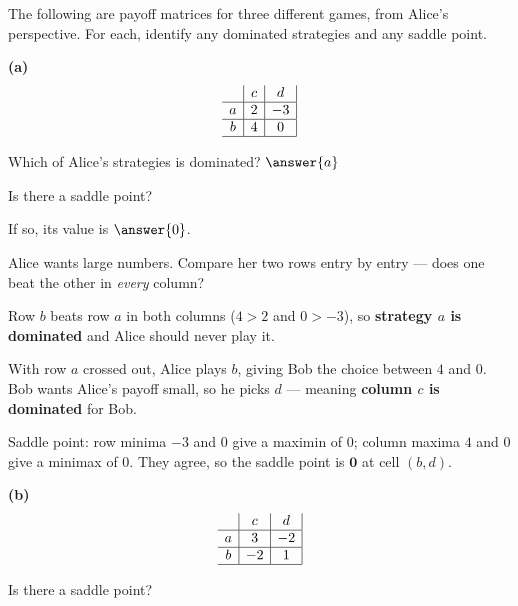 \documentclass[12pt]{ximera}
\begin{document}
\begin{problem}
The following are payoff matrices for three different games, from Alice's perspective.
For each, identify any dominated strategies and any saddle point.

\begin{prompt}
\textbf{(a)}
\[
\begin{array}{c|c|c|}
\phantom{|} & c & d \\\hline
a & 2 & -3 \\\hline
b & 4 & 0 \\\hline
\end{array}
\]

Which of Alice's strategies is dominated? $\answer{a}$

\smallskip
Is there a saddle point?
\begin{multipleChoice}
\end{multipleChoice}
If so, its value is $\answer{0}$.

\begin{hint}
Alice wants large numbers. Compare her two rows entry by entry --- does one beat the
other in \emph{every} column?
\end{hint}

\begin{feedback}
Row $b$ beats row $a$ in both columns ($4 > 2$ and $0 > -3$), so \textbf{strategy $a$
is dominated} and Alice should never play it.

With row $a$ crossed out, Alice plays $b$, giving Bob the choice between $4$ and $0$.
Bob wants Alice's payoff small, so he picks $d$ --- meaning \textbf{column $c$ is
dominated} for Bob.

Saddle point: row minima $-3$ and $0$ give a maximin of $0$; column maxima $4$ and $0$
give a minimax of $0$. They agree, so the saddle point is $\mathbf{0}$ at cell
$(b,d)$.
\end{feedback}
\end{prompt}

\begin{prompt}
\textbf{(b)}
\[
\begin{array}{c|c|c|}
\phantom{|} & c & d \\\hline
a & 3 & -2 \\\hline
b & -2 & 1 \\\hline
\end{array}
\]

Is there a saddle point?
\begin{multipleChoice}
\end{multipleChoice}


\end{prompt}
\end{problem}
\end{document}
